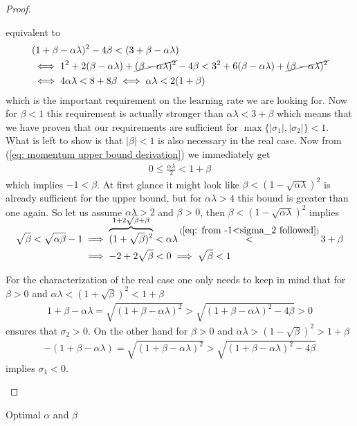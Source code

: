 \begin{proof}
\begin{description}[wide, labelindent=0pt]
		equivalent to 
		\begin{align}
			\nonumber
			&(1+\beta-\alpha\lambda)^2 - 4\beta < (3+\beta-\alpha\lambda)\\
			\nonumber
			&\iff 1^2 + 2(\beta-\alpha\lambda) + \cancel{(\beta-\alpha\lambda)^2} - 4\beta
			< 3^2 + 6(\beta-\alpha\lambda) + \cancel{(\beta-\alpha\lambda)^2}\\
			\label{eq: momentum upper bound derivation}
			&\iff 4\alpha\lambda < 8 + 8\beta
			\iff \alpha\lambda < 2(1+\beta)
		\end{align}
		which is the important requirement on the learning rate we are looking for.
		Now for \(\beta<1\) this requirement is actually stronger than
		\(\alpha\lambda <3+\beta\) which means that we have proven that our
		requirements are sufficient for \(\max\{|\sigma_1|,|\sigma_2|\}<1\).
		What is left to show is that \(|\beta|<1\) is also necessary in the real
		case. Now from (\ref{eq: momentum upper bound derivation}) we immediately
		get
		\begin{align*}
			0 \le \tfrac{\alpha\lambda}2 < 1+\beta
		\end{align*}
		which implies \(-1 < \beta\). At first glance it might look like
		\(\beta<(1-\sqrt{\alpha\lambda})^2\) is already sufficient for the upper
		bound, but for \(\alpha\lambda>4\) this bound is greater than one again.
		So let us assume \(\alpha\lambda>2\) and \(\beta>0\), then
		\(\beta<(1-\sqrt{\alpha\lambda})^2\) implies
		\begin{align*}
			\sqrt{\beta} < \sqrt{\alpha\beta} -1
			&\implies \smash{\overbrace{(1+\sqrt{\beta})^2}^{1+2\sqrt{\beta} + \beta}}
			< \alpha\lambda
			\stackrel{(\ref{eq: from -1<sigma_2 followed})}{<} 3+\beta \\
			&\implies -2 +2\sqrt{\beta} < 0
			\implies \sqrt{\beta} < 1
		\end{align*}

		For the characterization of the real case one only needs to keep in mind that for
		\(\beta>0\) and \(\alpha\lambda < (1+\sqrt{\beta})^2 <1+\beta\)
		\begin{align*}
			1+\beta-\alpha\lambda = \sqrt{(1+\beta-\alpha\lambda)^2}
			> \sqrt{(1+\beta-\alpha\lambda)^2 - 4\beta} > 0
		\end{align*}
		ensures that \(\sigma_2 >0\). On the other hand for \(\beta>0\)
		and \(\alpha\lambda > (1-\sqrt{\beta})^2> 1+\beta\)
		\begin{align*}
			- (1+\beta-\alpha\lambda) = \sqrt{(1+\beta-\alpha\lambda)^2}
			> \sqrt{(1+\beta-\alpha\lambda)^2 - 4\beta}
		\end{align*}
		implies \(\sigma_1 < 0\). \qedhere
 \end{description}
\end{proof}

\begin{corollary}
	Optimal \(\alpha\) and \(\beta\)
\end{corollary}


\endinput